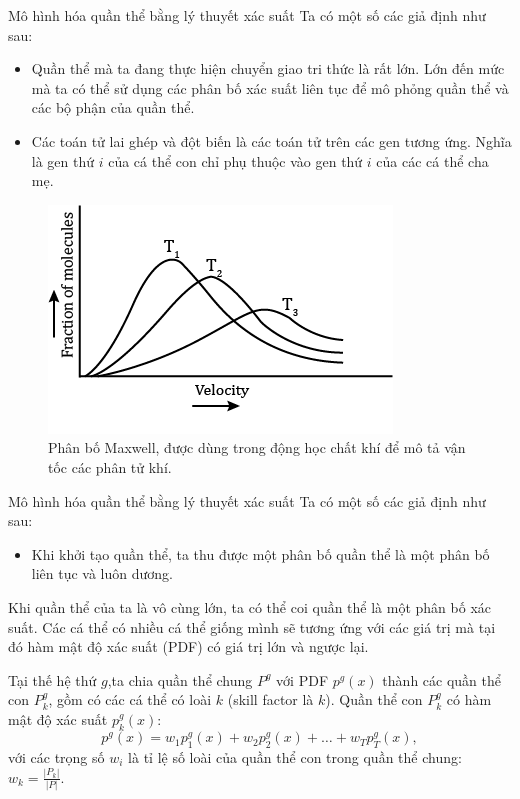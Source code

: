 \begin{frame}{Mô hình hóa quần thể bằng lý thuyết xác suất}
  Ta có một số các giả định như sau:
  \begin{itemize}
  \item Quần thể mà ta đang thực hiện chuyển giao tri thức là rất lớn. Lớn đến
    mức mà ta có thể sử dụng các phân bố xác suất liên tục để mô phỏng quần
    thể và các bộ phận của quần thể.
  \item Các toán tử lai ghép và đột biến là các toán tử trên các gen tương ứng.
    Nghĩa là gen thứ \( i \) của cá thể con chỉ phụ thuộc vào gen thứ \( i \) của
    các cá thể cha mẹ.
  \end{itemize}
\begin{figure}
  \centering
  \includegraphics[height=.25\textheight]{res/maxwell.png}
  \captionsetup{justification=centering,margin=3cm}
  \caption{Phân bố Maxwell, được dùng trong động học chất khí để mô tả vận tốc
  các phân tử khí.}
\end{figure}
\end{frame}

\begin{frame}{Mô hình hóa quần thể bằng lý thuyết xác suất}
  Ta có một số các giả định như sau:
  \begin{itemize}
  \item Khi khởi tạo quần thể, ta thu được một phân bố quần thể là một phân bố
    liên tục và luôn dương.
  \end{itemize}

  Khi quần thể của ta là vô cùng lớn, ta có thể coi quần thể là một phân bố xác
  suất. Các cá thể có nhiều cá thể giống mình sẽ tương ứng với các giá trị mà tại đó
  hàm mật độ xác suất (PDF) có giá trị lớn và ngược lại.

  Tại thế hệ thứ \( g \),ta chia quần thể chung \( P^{g} \) với PDF \( p^{g}(x)
  \) thành các quần thể con \( P_{k}^{g} \), gồm có các cá thể có loài \( k \)
  (skill factor là \( k \)). Quần thể con \( P^{g}_{k} \) có hàm mật độ xác suất
  \( p^{g}_{k}(x) \):
\[
  p^{g}(x) = w_{1}p^{g}_{1}(x) + 
w_{2}p^{g}_{2}(x) + 
\ldots +
w_{T}p^{g}_{T}(x)
,\]
với các trọng số \( w_{i} \) là tỉ lệ số loài của quần thể con trong quần thể
chung: \( w_{k} = \frac{|P_{k}|}{|P|} \).
\end{frame}

